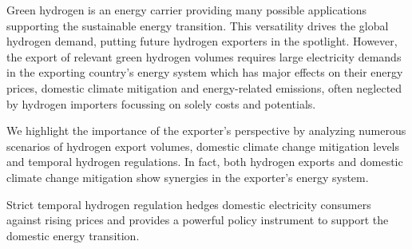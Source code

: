 Green hydrogen is an energy carrier providing many possible applications supporting the sustainable energy transition. 
This versatility drives the global hydrogen demand, putting future hydrogen exporters in the spotlight. 
However, the export of relevant green hydrogen volumes requires large electricity demands in the exporting country's energy system which has major effects on their energy prices, domestic climate mitigation and energy-related emissions, often neglected by hydrogen importers focussing on solely costs and potentials.

We highlight the importance of the exporter's perspective by analyzing numerous scenarios of hydrogen export volumes, domestic climate change mitigation levels and temporal hydrogen regulations. In fact, both hydrogen exports and domestic climate change mitigation show synergies in the exporter's energy system. 

Strict temporal hydrogen regulation hedges domestic electricity consumers against rising prices and provides a powerful policy instrument to support the domestic energy transition.

